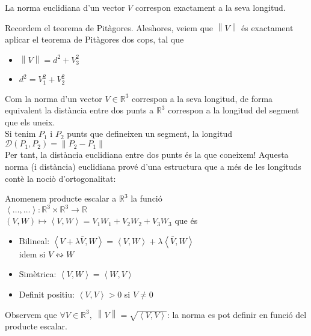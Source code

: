 \documentclass[../main.tex]{subfiles}
\begin{document}
\begin{obs}
    La norma euclidiana d'un vector $V$ correspon exactament a la seva longitud.
\end{obs}
\begin{demostracio}
    Recordem el teorema de Pitàgores. Aleshores, veiem que $\left\lVert V\right\rVert$ és exactament
    aplicar el teorema de Pitàgores dos cops, tal que
    \begin{itemize}
        \item $\left\lVert V\right\rVert = d^2 + V_3^2$
        \item $d^2 = V_1^2+V_2^2$
    \end{itemize}
\end{demostracio}
Com la norma d'un vector $V \in \mathbb{R}^3$ correspon a la seva longitud, de forma equivalent la
distància entre dos punts a $\mathbb{R}^3$ correspon a la longitud del segment que els uneix.\\
Si tenim $P_1\text{ i }P_2$ punts que defineixen un segment, la longitud $\mathcal{D}\left(P_1, P_2\right) = \left\lVert P_2-P_1\right\rVert$\\
Per tant, la distància euclidiana entre dos punts és la que coneixem!
Aquesta norma (i distància) euclidiana prové d'una estructura que a més de les longítuds contè la
nociò d'ortogonalitat:
\begin{definicio}
    Anomenem producte escalar a $\mathbb{R}^3$ la funció\\
    $\left\langle\dots, \dots\right\rangle: \mathbb{R}^3 \times \mathbb{R}^3 \to \mathbb{R}$\\
    $\left(V, W\right) \mapsto \left\langle V, W\right\rangle = V_1W_1 + V_2W_2 + V_3W_3$
    que és
    \begin{itemize}
        \item Bilineal: $\left\langle V+\lambda \bar{V}, W\right\rangle = \left\langle V, W\right\rangle + \lambda\left\langle \bar{V}, W\right\rangle$
        \\ idem si $V \leftrightsquigarrow W$
        \item Simètrica: $\left\langle V, W\right\rangle = \left\langle W, V\right\rangle$
        \item Definit positiu: $\left\langle V, V\right\rangle > 0$ si $V \neq 0$
    \end{itemize}
\end{definicio}
Observem que $\forall V \in \mathbb{R}^3,\;\left\lVert V\right\rVert = \sqrt{\left\langle V, V\right\rangle}$:
la norma es pot definir en funció del producte escalar.\\
\end{document}
